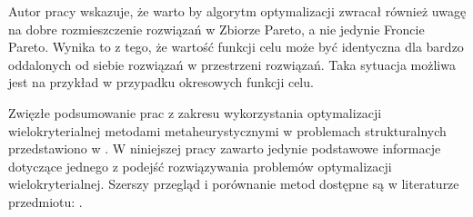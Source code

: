 Autor pracy \cite{Banach2017} wskazuje, że warto by algorytm optymalizacji zwracał również uwagę na dobre rozmieszczenie rozwiązań w Zbiorze Pareto, a nie jedynie Froncie Pareto. Wynika to z tego, że wartość funkcji celu może być identyczna dla bardzo oddalonych od siebie rozwiązań w przestrzeni rozwiązań. Taka sytuacja możliwa jest na przykład w przypadku okresowych funkcji celu.

Zwięzłe podsumowanie prac z zakresu wykorzystania optymalizacji wielokryterialnej metodami metaheurystycznymi w problemach strukturalnych przedstawiono w \parencite{Zavala2014}. W niniejszej pracy zawarto jedynie podstawowe informacje dotyczące jednego z podejść rozwiązywania problemów optymalizacji wielokryterialnej. Szerszy przegląd i porównanie metod dostępne są w literaturze przedmiotu: \parencite{Miettinen1999,Zitzler2000,Elbeltagi2005,Abido2006,Coello2007,Lalwani2013,Zaman2019}. 

